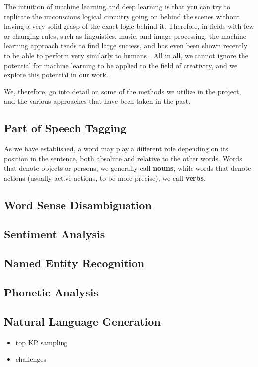 The intuition of machine learning and deep learning is that you can try to replicate the unconscious logical circuitry going on behind the scenes without having a very solid grasp of the exact logic behind it. Therefore, in fields with few or changing rules, such as linguistics, music, and image processing, the machine learning approach tends to find large success, and has even been shown recently to be able to perform very similarly to humans \citep{bubeck2023sparks}. All in all, we cannot ignore the potential for machine learning to be applied to the field of creativity, and we explore this potential in our work.

We, therefore, go into detail on some of the methods we utilize in the project, and the various approaches that have been taken in the past.

\subsection{Part of Speech Tagging}
As we have established, a word may play a different role depending on its position in the sentence, both absolute and relative to the other words. Words that denote objects or persons, we generally call \textbf{nouns}, while words that denote actions (usually active actions, to be more precise), we call \textbf{verbs}. 

\subsection{Word Sense Disambiguation}

\subsection{Sentiment Analysis}

\subsection{Named Entity Recognition}

\subsection{Phonetic Analysis}

\subsection{Natural Language Generation}
\begin{itemize}
    \item top KP sampling
    \item challenges 
\end{itemize}


